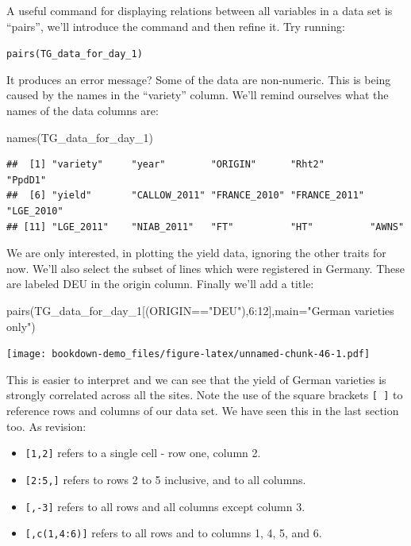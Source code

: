 \documentclass[
]{book}
\newenvironment{Shaded}{\begin{snugshade}}{\end{snugshade}}
\newcommand{\AttributeTok}[1]{\textcolor[rgb]{0.77,0.63,0.00}{#1}}
\newcommand{\DecValTok}[1]{\textcolor[rgb]{0.00,0.00,0.81}{#1}}
\newcommand{\FunctionTok}[1]{\textcolor[rgb]{0.00,0.00,0.00}{#1}}
\newcommand{\NormalTok}[1]{#1}
\newcommand{\SpecialCharTok}[1]{\textcolor[rgb]{0.00,0.00,0.00}{#1}}
\newcommand{\StringTok}[1]{\textcolor[rgb]{0.31,0.60,0.02}{#1}}
\providecommand{\tightlist}{%
  \setlength{\itemsep}{0pt}\setlength{\parskip}{0pt}}
\begin{document}
A useful command for displaying relations between all variables in a data set is ``pairs'', we'll introduce the command and then refine it. Try running:

\texttt{pairs(TG\_data\_for\_day\_1)}

It produces an error message? Some of the data are non-numeric. This is being caused by the names in the ``variety'' column. We'll remind ourselves what the names of the data columns are:

\begin{Shaded}
\begin{Highlighting}[]
\FunctionTok{names}\NormalTok{(TG\_data\_for\_day\_1)}
\end{Highlighting}
\end{Shaded}

\begin{verbatim}
##  [1] "variety"     "year"        "ORIGIN"      "Rht2"        "PpdD1"      
##  [6] "yield"       "CALLOW_2011" "FRANCE_2010" "FRANCE_2011" "LGE_2010"   
## [11] "LGE_2011"    "NIAB_2011"   "FT"          "HT"          "AWNS"
\end{verbatim}

We are only interested, in plotting the yield data, ignoring the other traits for now. We'll also select the subset of lines which were registered in Germany. These are labeled DEU in the origin column. Finally we'll add a title:

\begin{Shaded}
\begin{Highlighting}[]
\FunctionTok{pairs}\NormalTok{(TG\_data\_for\_day\_1[(ORIGIN}\SpecialCharTok{==}\StringTok{"DEU"}\NormalTok{),}\DecValTok{6}\SpecialCharTok{:}\DecValTok{12}\NormalTok{],}\AttributeTok{main=}\StringTok{"German varieties only"}\NormalTok{)}
\end{Highlighting}
\end{Shaded}

\texttt{[image: bookdown-demo\_files/figure-latex/unnamed-chunk-46-1.pdf]}

This is easier to interpret and we can see that the yield of German varieties is strongly correlated across all the sites. Note the use of the square brackets \texttt{{[}\ {]}} to reference rows and columns of our data set. We have seen this in the last section too. As revision:

\begin{itemize}
\tightlist
\item
  \texttt{{[}1,2{]}} refers to a single cell - row one, column 2.
\item
  \texttt{{[}2:5,{]}} refers to rows 2 to 5 inclusive, and to all columns.
\item
  \texttt{{[},-3{]}} refers to all rows and all columns except column 3.
\item
  \texttt{{[},c(1,4:6){]}} refers to all rows and to columns 1, 4, 5, and 6.
\end{itemize}
\end{document}
